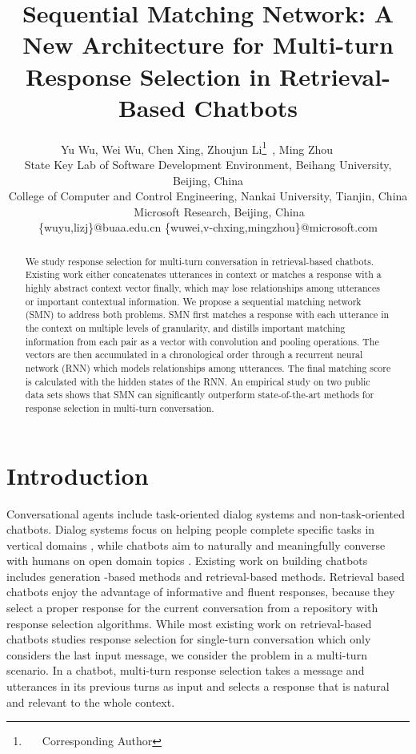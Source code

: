 \documentclass[11pt,a4paper]{article}
\title{Sequential Matching Network: A New Architecture for Multi-turn Response Selection in Retrieval-Based Chatbots}
\author{
	Yu Wu, Wei Wu,	Chen Xing, Zhoujun Li\thanks{~~~Corresponding Author}~, Ming Zhou~~~~\\
	State Key Lab of Software Development Environment, Beihang University, Beijing, China\\
	College of Computer and Control Engineering, Nankai University, Tianjin, China\\
	~~~~Microsoft Research, Beijing, China\\
	\{wuyu,lizj\}@buaa.edu.cn \{wuwei,v-chxing,mingzhou\}@microsoft.com 
}
\date{}
\begin{document}
	\maketitle
	\begin{abstract}
		We study response selection for multi-turn conversation in retrieval-based chatbots. Existing work either concatenates utterances in context or matches a response with a highly abstract context vector finally, which may lose relationships among utterances or important contextual information. We propose a sequential matching network (SMN) to address both problems. SMN first matches a response with each utterance in the context on multiple levels of granularity, and distills important matching information from each pair as a vector with convolution and pooling operations. The vectors are then accumulated in a chronological order  through a recurrent neural network (RNN) which models relationships among utterances. The final matching score is calculated with the hidden states of the RNN. An empirical study on two public data sets shows that SMN can significantly outperform state-of-the-art methods for response selection in multi-turn conversation.
	\end{abstract}
	
	\section{Introduction}
Conversational agents include task-oriented dialog systems and non-task-oriented chatbots. Dialog systems focus on helping people complete specific tasks in vertical domains \cite{young2010hidden}, while chatbots aim to naturally and meaningfully converse with humans on open domain topics \cite{ritter2011data}. Existing work on building chatbots includes generation -based methods and retrieval-based methods. Retrieval based chatbots enjoy the advantage of informative and fluent responses, because they select a proper response for the current conversation from a repository with response selection algorithms.  While most existing work on retrieval-based chatbots studies response selection for single-turn conversation \cite{wang2013dataset} which only considers the last input message, we consider the problem in a multi-turn scenario. In a chatbot, multi-turn response selection takes a message and utterances in its previous turns as input and selects a response that is natural and relevant to the whole context.
	
\end{document}
